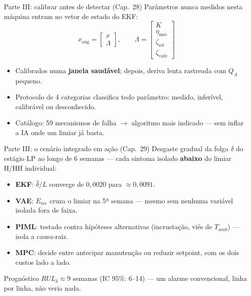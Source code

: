 \documentclass[aspectratio=169,12pt]{beamer}
\begin{document}
\begin{frame}{Parte III: calibrar antes de detectar (Cap.\ 28)}
	Parâmetros nunca medidos nesta máquina entram no vetor de estado do EKF:
	\begin{equation*}
		x_{\text{aug}} = \begin{bmatrix} x \\ \Lambda \end{bmatrix}, \qquad \Lambda = \begin{bmatrix} K \\ \eta_{\text{mec}} \\ \zeta_{\text{ref}} \\ \zeta_{\text{valv}} \end{bmatrix}
	\end{equation*}
	\begin{itemize}
		\item Calibrados numa \textbf{janela saudável}; depois, deriva lenta rastreada com $Q_\Lambda$ pequeno.
		\item Protocolo de 4 categorias classifica todo parâmetro: medido, inferível, calibrável ou desconhecido.
		\item Catálogo: 59 mecanismos de falha $\to$ algoritmo mais indicado — sem inflar a IA onde um limiar já basta.
	\end{itemize}
\end{frame}

\begin{frame}{Parte III: o cenário integrado em ação (Cap.\ 29)}
	Desgaste gradual da folga $\delta$ do estágio LP ao longo de 6 semanas — cada sintoma isolado \textbf{abaixo} do limiar H/HH individual:
	\begin{itemize}
		\item \textbf{EKF}: $\hat\delta/L$ converge de $0{,}0020$ para $\approx 0{,}0091$.
		\item \textbf{VAE}: $E_{\text{rec}}$ cruza o limiar na 5ª semana — mesmo sem nenhuma variável isolada fora de faixa.
		\item \textbf{PIML}: testado contra hipóteses alternativas (incrustação, viés de $T_{amb}$) — isola a causa-raiz.
		\item \textbf{MPC}: decide entre antecipar manutenção ou reduzir setpoint, com os dois custos lado a lado.
	\end{itemize}
	\begin{alertblock}{Prognóstico}
		$RUL_\delta \approx 9$ semanas (IC 95\%: 6--14) — um alarme convencional, linha por linha, não veria nada.
	\end{alertblock}
\end{frame}
\end{document}
